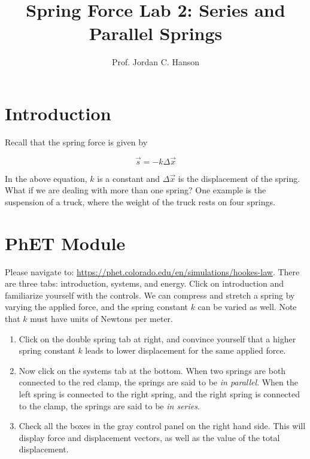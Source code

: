 \documentclass{article}
\begin{document}
\title{Spring Force Lab 2: Series and Parallel Springs}
\author{Prof. Jordan C. Hanson}

\maketitle

\section{Introduction}

Recall that the spring force is given by

\begin{equation}
\vec{s} = -k \Delta \vec{x} \label{eq:hooke}
\end{equation}

In the above equation, $k$ is a constant and $\Delta \vec{x}$ is the displacement of the spring.  What if we are dealing with more than one spring?  One example is the suspension of a truck, where the weight of the truck rests on four springs.

\section{PhET Module}

Please navigate to: \url{https://phet.colorado.edu/en/simulations/hookes-law}.  There are three tabs: introduction, systems, and energy.  Click on introduction and familiarize yourself with the controls.  We can compress and stretch a spring by varying the applied force, and the spring constant $k$ can be varied as well.  Note that $k$ must have units of Newtons per meter.
\begin{enumerate}
\item Click on the double spring tab at right, and convince yourself that a higher spring constant $k$ leads to lower displacement for the same applied force.
\item Now click on the systems tab at the bottom.  When two springs are both connected to the red clamp, the springs are said to be \textit{in parallel}.  When the left spring is connected to the right spring, and the right spring is connected to the clamp, the springs are said to be \textit{in series}.
\item Check all the boxes in the gray control panel on the right hand side.  This will display force and displacement vectors, as well as the value of the total displacement.
\end{enumerate}
\end{document}
